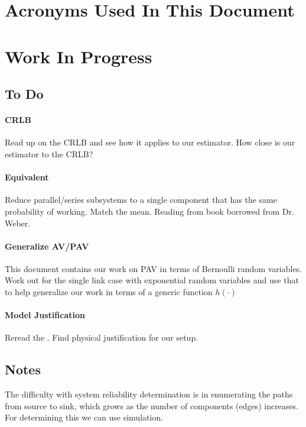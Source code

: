 \documentclass[10pt]{article}
\begin{document}
\tableofcontents
\listoffigures
\section*{Acronyms Used In This Document}
\begin{acronym}
\end{acronym}

\setcounter{section}{-1}
\section{Work In Progress}
\subsection{To Do}
\paragraph{CRLB}
Read up on the \ac{CRLB} and see how it applies to our estimator. How close is our estimator to the \ac{CRLB}?

\paragraph{Equivalent}
Reduce parallel/series subsystems to a single component that has the same probability of working. Match the mean. Reading from book borrowed from Dr. Weber.

\paragraph{Generalize AV/PAV}
This document contains our work on \ac{PAV} in terms of Bernoulli random variables. Work out for the single link case with exponential random variables and use that to help generalize our work in terms of a generic function $h(\cdot)$

\paragraph{Model Justification}
Reread the \cite{ni-2008}. Find physical justification for our setup.

\subsection{Notes}
The difficulty with system reliability determination is in enumerating the paths from source to sink, which grows as the number of components (edges) increases. For determining this we can use simulation.
\end{document}
